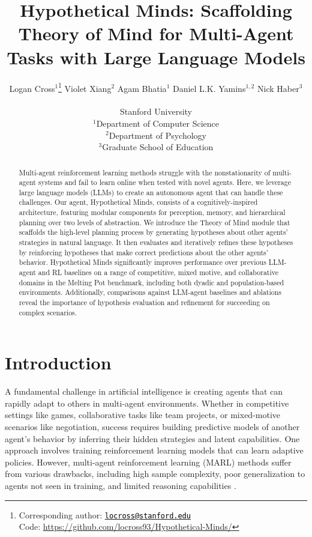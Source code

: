 \documentclass{article} %
\title{Hypothetical Minds: Scaffolding Theory of Mind for Multi-Agent Tasks with Large Language Models}
\author{%
  Logan Cross$^1$\thanks{Corresponding author: \texttt{\href{mailto:locross@stanford.edu}{\textcolor{black}{locross@stanford.edu}}} \\
  Code: \href{https://github.com/locross93/Hypothetical-Minds/}{https://github.com/locross93/Hypothetical-Minds/}}
  \quad Violet Xiang$^2$
  \quad Agam Bhatia$^1$
  \quad Daniel L.K. Yamins$^{1,2}$
  \quad Nick Haber$^3$ \\
  \\
  Stanford University \\
  $^1$Department of Computer Science \\
  $^2$Department of Psychology \\
  $^3$Graduate School of Education
}
\begin{document}
\maketitle

\begin{abstract}
Multi-agent reinforcement learning methods struggle with the nonstationarity of multi-agent systems and fail to learn online when tested with novel agents. Here, we leverage large language models (LLMs) to create an autonomous agent that can handle these challenges. Our agent, Hypothetical Minds, consists of a cognitively-inspired architecture, featuring modular components for perception, memory, and hierarchical planning over two levels of abstraction. We introduce the Theory of Mind module that scaffolds the high-level planning process by generating hypotheses about other agents' strategies in natural language. It then evaluates and iteratively refines these hypotheses by reinforcing hypotheses that make correct predictions about the other agents' behavior. Hypothetical Minds significantly improves performance over previous LLM-agent and RL baselines on a range of competitive, mixed motive, and collaborative domains in the Melting Pot benchmark, including both dyadic and population-based environments. Additionally, comparisons against LLM-agent baselines and ablations reveal the importance of hypothesis evaluation and refinement for succeeding on complex scenarios.
\end{abstract}

\section{Introduction}

A fundamental challenge in artificial intelligence is creating agents that can rapidly adapt to others in multi-agent environments. Whether in competitive settings like games, collaborative tasks like team projects, or mixed-motive scenarios like negotiation, success requires building predictive models of another agent's behavior by inferring their hidden strategies and latent capabilities. One approach involves training reinforcement learning models that can learn adaptive policies. However, multi-agent reinforcement learning (MARL) methods suffer from various drawbacks, including high sample complexity, poor generalization to agents not seen in training, and limited reasoning capabilities \citep{wong2023deep}.

\end{document}
